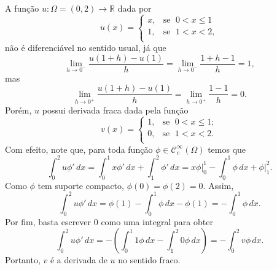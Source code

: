 \documentclass[a4paper, 11pt]{book}
\theoremstyle{definition}
\newcommand{\bR}{\mathbb{R}}
\newcommand{\cC}{\mathcal{C}}
\begin{document}
\begin{ex} \label{ex:derivada-fraca-R}
    A função $u : \Omega  =(0,2) \to \bR$ dada por
    \[
        u(x) = \left\{
            \begin{array}{rl}
                x, & \!\text{se }\; 0 < x \leqslant 1\\
                1, & \!\text{se }\; 1 < x < 2,\\
            \end{array}
        \right.
    \]
    não é diferenciável no sentido usual, já que
    \[
        \lim_{h\to 0^-} \frac{u(1 + h) - u(1)}{h} = \lim_{h \to 0^-} \frac{1 + h -1}{h} = 1,
    \]
    mas
    \[
        \lim_{h\to 0^+} \frac{u(1 + h) - u(1)}{h} = \lim_{h \to 0^+} \frac{1 -1}{h} = 0.
    \]
    Porém, $u$ possui derivada fraca dada pela função
    \[
        v(x) = \left\{
            \begin{array}{rl}
                1, & \text{se }\; 0 < x \leqslant 1;\\
                0, & \text{se }\; 1 < x < 2.\\
            \end{array}
        \right.
    \]
    Com efeito, note que, para toda função $\phi \in \cC^\infty_c(\Omega)$ temos que
    \[
        \int_0^2 u \phi' \,dx = \int_0^1 x \phi' \,dx + \int_1^2 \phi' \,dx = x \phi \bigg|_0^1 - \int_0^1 \phi \,dx + \phi \bigg|_1^2.
    \]
    Como $\phi$ tem suporte compacto, $\phi(0) = \phi(2) = 0$. Assim,
    \[
        \int_0^2 u \phi' \,dx = \phi(1) - \int_0^1 \phi \,dx - \phi(1) = -\int_0^1 \phi \,dx.
    \]
    Por fim, basta escrever $0$ como uma integral para obter
    \[
        \int_0^2 u \phi' \,dx = - \left(  \int_0^1 1\phi \, dx - \int_1^2 0\phi \,dx  \right) = -\int_0^2 v \phi \,dx.
    \]
    Portanto, $v$ é a derivada de $u$ no sentido fraco.
\end{ex}
\end{document}
